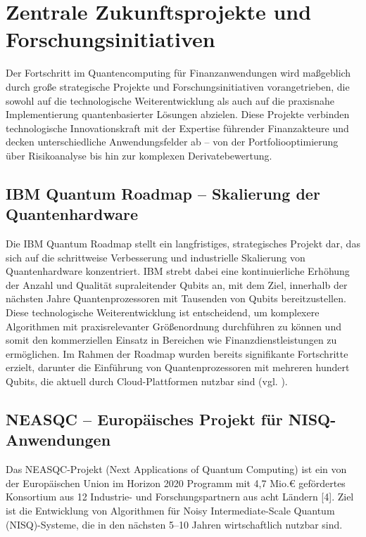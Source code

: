 \section{Zentrale Zukunftsprojekte und Forschungsinitiativen}

Der Fortschritt im Quantencomputing für Finanzanwendungen wird maßgeblich durch große strategische Projekte und Forschungsinitiativen vorangetrieben, die sowohl auf die technologische Weiterentwicklung als auch auf die praxisnahe Implementierung quantenbasierter Lösungen abzielen. Diese Projekte verbinden technologische Innovationskraft mit der Expertise führender Finanzakteure und decken unterschiedliche Anwendungsfelder ab – von der Portfoliooptimierung über Risikoanalyse bis hin zur komplexen Derivatebewertung.

\subsection{IBM Quantum Roadmap – Skalierung der Quantenhardware}

Die IBM Quantum Roadmap stellt ein langfristiges, strategisches Projekt dar, das sich auf die schrittweise Verbesserung und industrielle Skalierung von Quantenhardware konzentriert. IBM strebt dabei eine kontinuierliche Erhöhung der Anzahl und Qualität supraleitender Qubits an, mit dem Ziel, innerhalb der nächsten Jahre Quantenprozessoren mit Tausenden von Qubits bereitzustellen. Diese technologische Weiterentwicklung ist entscheidend, um komplexere Algorithmen mit praxisrelevanter Größenordnung durchführen zu können und somit den kommerziellen Einsatz in Bereichen wie Finanzdienstleistungen zu ermöglichen. Im Rahmen der Roadmap wurden bereits signifikante Fortschritte erzielt, darunter die Einführung von Quantenprozessoren mit mehreren hundert Qubits, die aktuell durch Cloud-Plattformen nutzbar sind (vgl. \cite{IBM Quantum, 2023}).

\subsection{NEASQC – Europäisches Projekt für NISQ-Anwendungen}

Das NEASQC-Projekt (Next Applications of Quantum Computing) ist ein von der Europäischen Union im Horizon 2020 Programm mit 4,7 Mio.€ gefördertes Konsortium aus 12 Industrie- und Forschungspartnern aus acht Ländern [4]. Ziel ist die Entwicklung von Algorithmen für Noisy Intermediate-Scale Quantum (NISQ)-Systeme, die in den nächsten 5–10 Jahren wirtschaftlich nutzbar sind.

